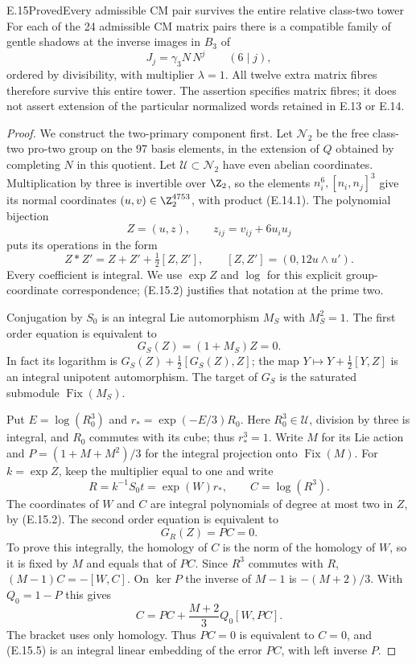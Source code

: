 \begin{statement}{E.15}{Proved}{Every admissible CM pair survives the entire relative class-two tower}
For each of the 24 admissible CM matrix pairs there is a
compatible family of gentle shadows at the inverse images
in $B_3$ of
\[
             J_j=\gamma_3N\,N^j\qquad(6\mid j),
 \tag{E.15.1}
\]
ordered by divisibility, with multiplier $\lambda=1$.
All twelve extra matrix fibres therefore survive this
entire tower. The assertion specifies matrix fibres;
it does not assert extension of the particular normalized
words retained in E.13 or E.14.
\end{statement}
\begin{proof}
We construct the two-primary component first. Let
$\mathcal N_2$ be the free class-two pro-two group on
the 97 basis elements, in the extension of $Q$ obtained
by completing $N$ in this quotient. Let
$\mathcal U\subset\mathcal N_2$ have even abelian
coordinates. Multiplication by three is invertible over
$\Z_2$, so the elements $n_i^6,[n_i,n_j]^3$ give its
normal coordinates $(u,v)\in\Z_2^{4753}$, with product
(E.14.1). The polynomial bijection
\[
 Z=(u,z),\qquad z_{ij}=v_{ij}+6u_i u_j
\]
puts its operations in the form
\[
 Z*Z'=Z+Z'+\tfrac12[Z,Z'],\qquad
 [Z,Z']=(0,12u\wedge u').
 \tag{E.15.2}
\]
Every coefficient is integral. We use $\exp Z$ and
$\log$ for this explicit group-coordinate correspondence;
(E.15.2) justifies that notation at the prime two.

Conjugation by $S_0$ is an integral Lie automorphism $M_S$
with $M_S^2=1$. The first order equation is equivalent to
\[
                       G_S(Z)=(1+M_S)Z=0.
 \tag{E.15.3}
\]
In fact its logarithm is
$G_S(Z)+\frac12[G_S(Z),Z]$; the map
$Y\mapsto Y+\frac12[Y,Z]$ is an integral unipotent
automorphism. The target of $G_S$ is the saturated
submodule $\operatorname{Fix}(M_S)$.

Put $E=\log(R_0^3)$ and $r_*=\exp(-E/3)R_0$.
Here $R_0^3\in\mathcal U$, division by three is integral,
and $R_0$ commutes with its cube; thus $r_*^3=1$.
Write $M$ for its Lie action and
$P=(1+M+M^2)/3$ for the integral projection onto
$\operatorname{Fix}(M)$. For $k=\exp Z$, keep the
multiplier equal to one and write
\[
 R=k^{-1}S_0t=\exp(W)r_*,\qquad C=\log(R^3).
\]
The coordinates of $W$ and $C$ are integral polynomials
of degree at most two in $Z$, by (E.15.2).
The second order equation is equivalent to
\[
                              G_R(Z)=PC=0.
 \tag{E.15.4}
\]
To prove this integrally, the homology of $C$ is the
norm of the homology of $W$, so it is fixed by $M$ and
equals that of $PC$. Since $R^3$ commutes with $R$,
$(M-1)C=-[W,C]$. On $\ker P$ the inverse of $M-1$
is $-(M+2)/3$. With $Q_0=1-P$ this gives
\[
             C=PC+\frac{M+2}{3}Q_0[W,PC].
 \tag{E.15.5}
\]
The bracket uses only homology. Thus $PC=0$ is equivalent
to $C=0$, and (E.15.5) is an integral linear embedding
of the error $PC$, with left inverse $P$.


\end{proof}
